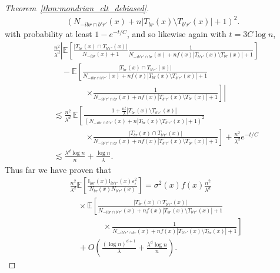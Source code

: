 \documentclass[11pt,lof]{puthesis}
\newcommand{\E}{\ensuremath{\mathbb{E}}}
\newcommand{\I}{\ensuremath{\mathbb{I}}}
\theoremstyle{break}
\theoremstyle{proof}
\newtheorem{proof}{Proof}
\begin{document}
\begin{proof}[Theorem~\ref{thm:mondrian_clt_debiased}]
\begin{align*}
    {\left(N_{-i b r \cap b' r'}(x)
    + n |T_{b r}(x) \setminus T_{b' r'}(x)|+1\right)^2}.
  \end{align*}
  with probability at least $1 - e^{-t/C}$,
  and so likewise again with $t = 3 C \log n$,
  \begin{align*}
    &\frac{n^2}{\lambda^d}
    \left|
      \E \left[
        \frac{|T_{b r}(x) \cap T_{b' r'}(x)|}{N_{-i b r}(x)+1}
        \frac{1}
        {N_{-i b' r' \cap b r}(x)+n f(x) |T_{b' r'}(x) \setminus T_{b r}(x)|+1}
      \right]
    \right.
    \\
    &\left.
      \quad-
      \E \left[
        \frac{|T_{b r}(x) \cap T_{b' r'}(x)|}
        {N_{-i b r \cap b' r'}(x) + n f(x) |T_{b r}(x) \setminus
        T_{b' r'}(x)|+1}
    \right.\right. \\
    &\qquad\qquad\left.\left.
        \times
        \frac{1}
        {N_{-i b' r' \cap b r}(x)+n f(x) |T_{b' r'}(x) \setminus T_{b r}(x)|+1}
      \right]
    \right| \\
    &\lesssim
    \frac{n^2}{\lambda^d} \,
    \E \left[
      \frac{1 + \frac{n t}{\lambda} |T_{b r}(x) \setminus T_{b' r'}(x)|}
      {\left(N_{-i b r \cap b' r'}(x)
      + n |T_{b r}(x) \setminus T_{b' r'}(x)|+1\right)^2}
    \right. \\
    &\qquad\qquad\left.
      \times
      \frac{|T_{b r}(x) \cap T_{b' r'}(x)|}
      {N_{-i b' r' \cap b r}(x)+n f(x) |T_{b' r'}(x) \setminus T_{b r}(x)|+1}
    \right]
    + \frac{n^2}{\lambda^d}
    e^{-t/C} \\
    &\lesssim
    \frac{\lambda^d \log n}{n}
    + \frac{\log n}{\lambda}.
  \end{align*}
  Thus far we have proven that
  \begin{align*}
    &\frac{n^2}{\lambda^d}
    \E \left[
      \frac{\I_{i b r}(x) \I_{i b' r'}(x) \varepsilon_i^2}
      {N_{b r}(x) N_{b' r'}(x)}
    \right]
    = \sigma^2(x)
    f(x)
    \frac{n^2}{\lambda^d} \\
    &\quad\times
    \E \left[
      \frac{|T_{b r}(x) \cap T_{b' r'}(x)|}
      {N_{-i b r \cap b' r'}(x) + n f(x) |T_{b r}(x) \setminus T_{b' r'}(x)|+1}
    \right. \\
    &\left.
      \qquad\qquad
      \times
      \frac{1}
      {N_{-i b' r' \cap b r}(x)+n f(x) |T_{b' r'}(x) \setminus T_{b r}(x)|+1}
    \right] \\
    &\quad+
    O \left(
      \frac{(\log n)^{d+1}}{\lambda}
      + \frac{\lambda^d \log n}{n}
    \right).
  \end{align*}

\end{proof}
\end{document}
